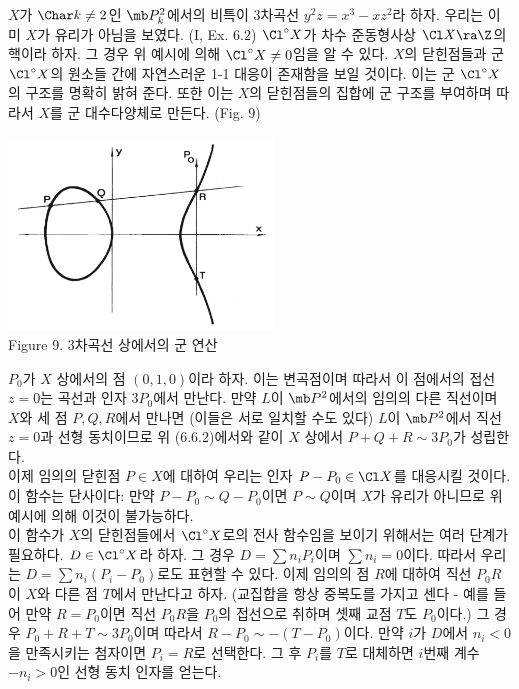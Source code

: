 	
	\begin{example}
	$X$가 $\Char k\ne 2$인 $\mb P_k^2$에서의 비특이 3차곡선 $y^2z=x^3-xz^2$라 하자.
	우리는 이미 $X$가 유리가 아님을 보였다. (I, Ex. 6.2)
	$\Cl^\circ X$가 차수 준동형사상 $\Cl X\ra\Z$의 핵이라 하자. 그 경우 위 예시에 의해 $\Cl^\circ X\ne 0$임을 알 수 있다.
	$X$의 닫힌점들과 군 $\Cl^\circ X$의 원소들 간에 자연스러운 1-1 대응이 존재함을 보일 것이다.
	이는 군 $\Cl^\circ X$의 구조를 명확히 밝혀 준다.
	또한 이는 $X$의 닫힌점들의 집합에 군 구조를 부여하며 따라서 $X$를 군 대수다양체로 만든다. (Fig. 9)
	\begin{center}
	\includegraphics[width=7cm]{Figure9}\\
	Figure 9. 3차곡선 상에서의 군 연산
	\end{center}
	$P_0$가 $X$ 상에서의 점 $(0,1,0)$이라 하자. 이는 변곡점이며 따라서 이 점에서의 접선 $z=0$는 곡선과 인자 $3P_0$에서 만난다.
	만약 $L$이 $\mb P^2$에서의 임의의 다른 직선이며 $X$와 세 점 $P,Q,R$에서 만나면 (이들은 서로 일치할 수도 있다)
	$L$이 $\mb P^2$에서 직선 $z=0$과 선형 동치이므로 위 (6.6.2)에서와 같이 $X$ 상에서 $P+Q+R\sim 3P_0$가 성립한다.\\
	이제 임의의 닫힌점 $P\in X$에 대하여 우리는 인자 $P-P_0\in\Cl X$를 대응시킬 것이다.
	이 함수는 단사이다: 만약 $P-P_0\sim Q-P_0$이면 $P\sim Q$이며 $X$가 유리가 아니므로 위 예시에 의해 이것이 불가능하다.\\
	이 함수가 $X$의 닫힌점들에서 $\Cl^\circ X$로의 전사 함수임을 보이기 위해서는 여러 단계가 필요하다.
	$D\in\Cl^\circ X$라 하자. 그 경우 $D=\sum n_iP_i$이며 $\sum n_i=0$이다.
	따라서 우리는 $D=\sum n_i(P_i-P_0)$로도 표현할 수 있다.
	이제 임의의 점 $R$에 대하여 직선 $P_0R$이 $X$와 다른 점 $T$에서 만난다고 하자.
	(교집합을 항상 중복도를 가지고 센다 - 예를 들어 만약 $R=P_0$이면 직선 $P_0R$을 $P_0$의 접선으로 취하며 셋째 교점 $T$도 $P_0$이다.)
	그 경우 $P_0+R+T\sim 3P_0$이며 따라서 $R-P_0\sim -(T-P_0)$이다.
	만약 $i$가 $D$에서 $n_i<0$을 만족시키는 첨자이면 $P_i=R$로 선택한다.
	그 후 $P_i$를 $T$로 대체하면 $i$번째 계수 $-n_i>0$인 선형 동치 인자를 얻는다.

\end{example}
